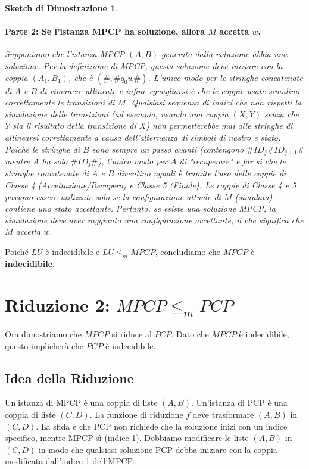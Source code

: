 \documentclass[a4paper, 11pt]{book} %
\newtheorem{proof_sketch}[theorem]{Sketch di Dimostrazione}
\theoremstyle{definition}
\begin{document}
\begin{proof_sketch}
\paragraph{Parte 2: Se l'istanza MPCP ha soluzione, allora $M$ accetta $w$.}
Supponiamo che l'istanza MPCP $(A, B)$ generata dalla riduzione abbia una soluzione.
Per la definizione di MPCP, questa soluzione deve iniziare con la coppia $(A_1, B_1)$, che è $(\#, \#q_0 w\#)$.
L'unico modo per le stringhe concatenate di $A$ e $B$ di rimanere allineate e infine eguagliarsi è che le coppie usate simulino correttamente le transizioni di $M$.
Qualsiasi sequenza di indici che non rispetti la simulazione delle transizioni (ad esempio, usando una coppia $(X,Y)$ senza che $Y$ sia il risultato della transizione di $X$) non permetterebbe mai alle stringhe di allinearsi correttamente a causa dell'alternanza di simboli di nastro e stato.
Poiché le stringhe di $B$ sono sempre un passo avanti (contengono $\#ID_j\#ID_{j+1}\#$ mentre $A$ ha solo $\#ID_j\#$), l'unico modo per $A$ di "recuperare" e far sì che le stringhe concatenate di $A$ e $B$ diventino uguali è tramite l'uso delle coppie di Classe 4 (Accettazione/Recupero) e Classe 5 (Finale).
Le coppie di Classe 4 e 5 possono essere utilizzate solo se la configurazione attuale di $M$ (simulata) contiene uno stato accettante.
Pertanto, se esiste una soluzione MPCP, la simulazione deve aver raggiunto una configurazione accettante, il che significa che $M$ accetta $w$.
\end{proof_sketch}

Poiché $LU$ è indecidibile e $LU \le_m MPCP$, concludiamo che $MPCP$ è \textbf{indecidibile}.

\section{Riduzione 2: $MPCP \le_m PCP$}

Ora dimostriamo che $MPCP$ si riduce al $PCP$. Dato che $MPCP$ è indecidibile, questo implicherà che $PCP$ è indecidibile.

\subsection{Idea della Riduzione}
Un'istanza di MPCP è una coppia di liste $(A, B)$. Un'istanza di PCP è una coppia di liste $(C, D)$.
La funzione di riduzione $f$ deve trasformare $(A, B)$ in $(C, D)$.
La sfida è che PCP non richiede che la soluzione inizi con un indice specifico, mentre MPCP sì (indice 1). Dobbiamo modificare le liste $(A, B)$ in $(C, D)$ in modo che qualsiasi soluzione PCP debba iniziare con la coppia modificata dall'indice 1 dell'MPCP.
\end{document}
